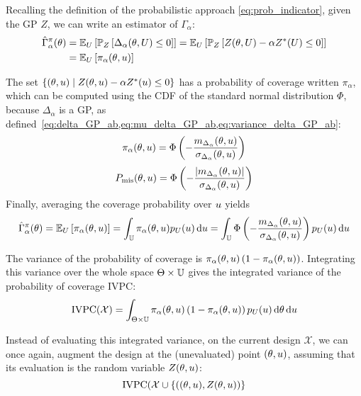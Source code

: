 \documentclass[../../Main_ManuscritThese.tex]{subfiles}
\begin{document}
Recalling the definition of the probabilistic approach \cref{eq:prob_indicator}, given the GP $Z$, we can write an estimator of $\Gamma_{\alpha}$:
\begin{align}
  \hat{\Gamma}_{\alpha}^{\pi}(\theta) &= \mathbb{E}_U\left[ \mathbb{P}_{Z}\left[ \Delta_{\alpha}(\theta,U) \leq 0\right]\right] = \mathbb{E}_U\left[ \mathbb{P}_{Z}\left[ Z(\theta, U) - \alpha Z^*(U) \leq 0\right]\right] \\ &= \mathbb{E}_U\left[\pi_{\alpha}(\theta,u)\right]
\end{align}

  
The set $\{(\theta, u) \mid Z(\theta, u) - \alpha Z^*(u)\leq 0\}$ has a probability of coverage written $\pi_{\alpha}$, which can be computed using the CDF of the standard normal distribution $\Phi$, because $\Delta_{\alpha}$ is a GP, as defined~\cref{eq:delta_GP_ab,eq:mu_delta_GP_ab,eq:variance_delta_GP_ab}:
\begin{equation}
  \label{eq:def_pialphaku}
  \pi_{\alpha}(\theta,u) = \Phi\left(-\frac{m_{\Delta_\alpha}(\theta,u)}{\sigma_{\Delta_\alpha}(\theta,u)}\right)
\end{equation}
\begin{equation}
  P_\mathrm{mis}(\theta, u) = \Phi\left(-\frac{\lvert m_{\Delta_\alpha}(\theta,u)\rvert}{\sigma_{\Delta_\alpha}(\theta,u)}\right)
\end{equation}
Finally, averaging the coverage probability over $u$ yields
\begin{equation}
  \hat{\Gamma}_{\alpha}^{\pi}(\theta) = \mathbb{E}_U\left[\pi_{\alpha}(\theta,u)\right]=\int_{\mathbb{U}}\pi_{\alpha}(\theta,u)p_{U}(u) \,\mathrm{d}u = \int_{\mathbb{U}}\Phi\left(-\frac{m_{\Delta_\alpha}(\theta,u)}{\sigma_{\Delta_\alpha}(\theta,u)}\right)p_{U}(u) \,\mathrm{d}u
\end{equation}

The variance of the probability of coverage is $\pi_\alpha(\theta, u) \left(1 - \pi_{\alpha}(\theta,u)\right)$.
Integrating this variance over the whole space $\Theta \times \mathbb{U}$ gives the integrated variance of the probability of coverage $\mathrm{IVPC}$:
\cite{bect_sequential_2012}
\begin{equation}
  \label{eq:IVPC_def}
\mathrm{IVPC}(\mathcal{X}) =  \int_{\Theta \times \mathbb{U}} \pi_{\alpha}(\theta, u) \left(1 - \pi_{\alpha}(\theta, u)\right)p_{U}(u)\,\mathrm{d}\theta \,\mathrm{d}u
\end{equation}

Instead of evaluating this integrated variance, on the current design $\mathcal{X}$, we can once again, augment the design at the (unevaluated) point $(\theta, u)$, assuming that its evaluation is the random variable $Z(\theta, u)$:
\begin{equation}
  \mathrm{IVPC}(\mathcal{X} \cup \{((\theta, u), Z(\theta, u))\}
\end{equation}
\end{document}
